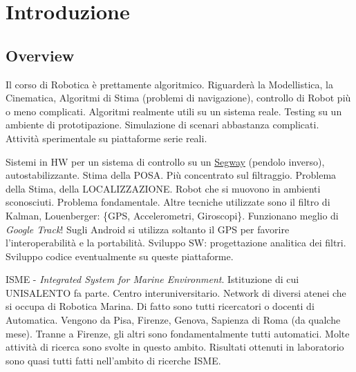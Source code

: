 
\chapter{Introduzione}
\label{cap:intro}

\section{Overview}

Il corso di Robotica è prettamente algoritmico. Riguarderà la Modellistica, la Cinematica, Algoritmi di Stima (problemi di navigazione), controllo di Robot più o meno complicati. Algoritmi realmente utili su un sistema reale. Testing su un ambiente di prototipazione. Simulazione di scenari abbastanza complicati. Attività sperimentale su piattaforme serie reali.

Sistemi in HW per un sistema di controllo su un \underline{Segway} (pendolo inverso), autostabilizzante. Stima della POSA. Più concentrato sul filtraggio. Problema della Stima, della LOCALIZZAZIONE. Robot che si muovono in ambienti sconosciuti. Problema fondamentale. Altre tecniche utilizzate sono il filtro di Kalman, Louenberger: \{GPS, Accelerometri, Giroscopi\}. Funzionano meglio di \emph{Google Track}! Sugli Android si utilizza soltanto il GPS per favorire l'interoperabilità e la portabilità. Sviluppo SW: progettazione analitica dei filtri. Sviluppo codice eventualmente su queste piattaforme.

ISME - \emph{Integrated System for Marine Environment}. Istituzione di cui UNISALENTO fa parte. Centro interuniversitario. Network di diversi atenei che si occupa di Robotica Marina. Di fatto sono tutti ricercatori o docenti di Automatica. Vengono da Pisa, Firenze, Genova, Sapienza di Roma (da qualche mese). Tranne a Firenze, gli altri sono fondamentalmente tutti automatici. Molte attività di ricerca sono svolte in questo ambito. Risultati ottenuti in laboratorio sono quasi tutti fatti nell'ambito di ricerche ISME.

